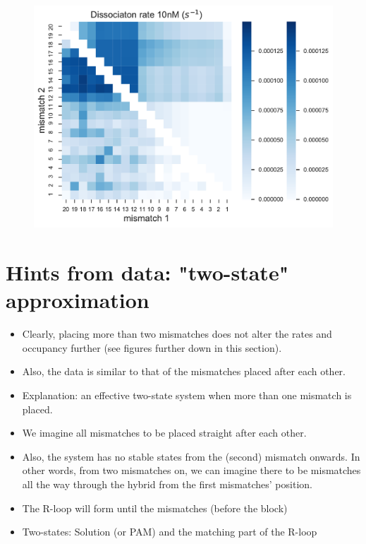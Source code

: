 \documentclass[a4paper,twoside]{revtex4-1}
\begin{document}
\begin{figure}[H]
\includegraphics[scale=0.5]{fig39_10_10_2018.pdf}
\end{figure}
\section{Hints from data: "two-state" approximation}
\begin{itemize}
\item Clearly, placing more than two mismatches does not alter the rates and occupancy further (see figures further down in this section). 
\item Also, the data is similar to that of the mismatches placed after each other.
\item Explanation: an effective two-state system when more than one mismatch is placed.
\item We imagine all mismatches to be placed straight after each other.
\item Also, the system has no stable states from the (second) mismatch onwards. In other words, from two mismatches on, we can imagine there to be mismatches all the way through the hybrid from the first mismatches' position. 
\item The R-loop will form until the mismatches (before the block)
\item Two-states: Solution (or PAM) and the matching part of the R-loop
\end{itemize}
\end{document}
